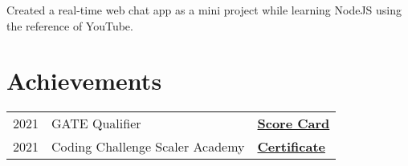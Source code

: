 \documentclass[]{deedy-resume-openfont}
\begin{document}
\begin{minipage}[t]{0.66\textwidth}
Created a real-time web chat app as a mini project while learning NodeJS using the reference of YouTube.
\sectionsep



\section{Achievements} 
\begin{tabular}{rll}
2021	     & GATE Qualifier  & \bf{\href{https://drive.google.com/file/d/15GE8USUrYsOLWMyxbJCKXGUEODwfVKVF/view?usp=sharing}{Score Card}}\\
2021     & Coding Challenge Scaler Academy &  \bf{\href{https://drive.google.com/file/d/1FvnQb3Byb9vj0uEbBudwzwYHRNe2MFp1/view}{Certificate}} \\
\end{tabular}
\sectionsep

\end{minipage} 
\end{document}
